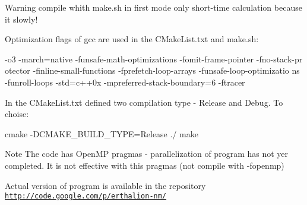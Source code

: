 \begin{DoxyWarning}{Warning}
compile whith make.sh in first mode only short-\/time calculation because it slowly!
\end{DoxyWarning}
Optimization flags of gcc are used in the CMakeList.txt and make.sh: 
\begin{DoxyCode}
 -o3 -march=native -funsafe-math-optimizations -fomit-frame-pointer -fno-stack-pr
      otector -finline-small-functions -fprefetch-loop-arrays -funsafe-loop-optimizatio
      ns -funroll-loops -std=c++0x -mpreferred-stack-boundary=6 -ftracer
\end{DoxyCode}


In the CMakeList.txt defined two compilation type -\/ Release and Debug. To choise:


\begin{DoxyCode}
  cmake -DCMAKE_BUILD_TYPE=Release ./
  make
\end{DoxyCode}


\begin{DoxyNote}{Note}
The code has OpenMP pragmas -\/ parallelization of program has not yer completed. It is not effective with this pragmas (not compile with -\/fopenmp)
\end{DoxyNote}
Actual version of program is available in the repository \href{http://code.google.com/p/erthalion-nm/}{\tt http://code.google.com/p/erthalion-\/nm/} 